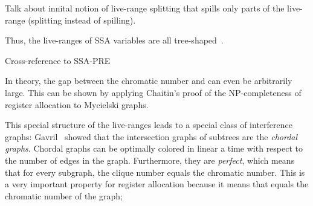 {\cite{Braun:2009:CC}

Talk about innital notion of live-range splitting that spills only parts of the live-range (splitting instead of spilling).

Thus, the live-ranges of SSA variables are all tree-shaped~\cite{Bouchez05:RR,brisk:2006:poly,HGG:2006:RA_SSA}.

Cross-reference to SSA-PRE

In theory, the gap between the chromatic number and \maxlive can even be arbitrarily large.
This can be shown by applying Chaitin's proof of the NP-completeness of register allocation to Mycielski graphs.

This special structure of the live-ranges leads to a special class of interference graphs:
Gavril~\cite{Gavril:1974:JCS} showed that the intersection graphs of subtrees are the \emph{chordal graphs}.
Chordal graphs can be optimally colored in linear a time with respect to the number of edges in the graph.
Furthermore, they are \emph{perfect}, which means that for every subgraph, the clique number equals the chromatic number. 
This is a very important property for register allocation because it means that \maxlive equals the chromatic number of the graph;
\endofchapter
}

